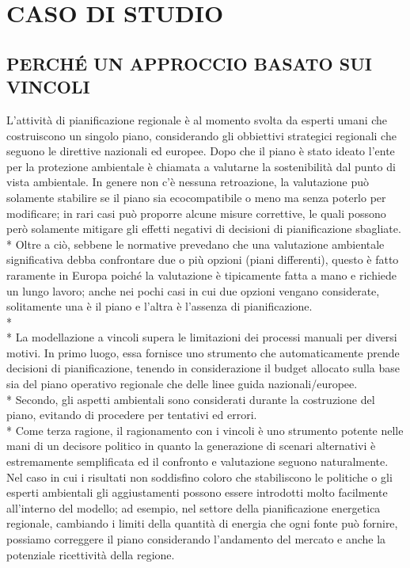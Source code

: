 \documentclass[12pt,a4paper,openright,twoside]{report}
\begin{document}
\section{CASO DI STUDIO}

\subsection[APPROCCIO A VINCOLI]{PERCHÉ UN APPROCCIO BASATO SUI VINCOLI}
L'attività di pianificazione regionale è al momento svolta da esperti umani che costruiscono un singolo piano, considerando gli obbiettivi strategici regionali che seguono le direttive nazionali ed europee. Dopo che il piano è stato ideato l'ente per la protezione ambientale è chiamata a valutarne la sostenibilità dal punto di vista ambientale. In genere non c'è nessuna retroazione, la valutazione può solamente stabilire se il piano sia ecocompatibile o meno ma senza poterlo per modificare; in rari casi può proporre alcune misure correttive, le quali possono però solamente mitigare gli effetti negativi di decisioni di pianificazione sbagliate.\\* 
Oltre a ciò, sebbene le normative prevedano che una valutazione ambientale significativa debba confrontare due o più opzioni (piani differenti), questo è fatto raramente in Europa poiché la valutazione è tipicamente fatta a mano e richiede un lungo lavoro; anche nei pochi casi in cui due opzioni vengano considerate, solitamente una è il piano e l'altra è l'assenza di pianificazione.\\*\\*
La modellazione a vincoli supera le limitazioni dei processi manuali per diversi motivi. In primo luogo, essa fornisce uno strumento che automaticamente prende decisioni di pianificazione, tenendo in considerazione il budget allocato sulla base sia del piano operativo regionale che delle linee guida nazionali/europee.\\*
Secondo, gli aspetti ambientali sono considerati durante la costruzione del piano, evitando di procedere per tentativi ed errori.\\*
Come terza ragione, il ragionamento con i vincoli è uno strumento potente nelle mani di un decisore politico in quanto la generazione di scenari alternativi è estremamente semplificata ed il confronto e valutazione seguono naturalmente. Nel caso in cui i risultati non soddisfino coloro che stabiliscono le politiche o gli esperti ambientali gli aggiustamenti possono essere introdotti molto facilmente all'interno del modello; ad esempio, nel settore della pianificazione energetica regionale, cambiando i limiti della quantità di energia che ogni fonte può fornire, possiamo correggere il piano considerando l'andamento del mercato e anche la potenziale ricettività della regione.
\end{document}
